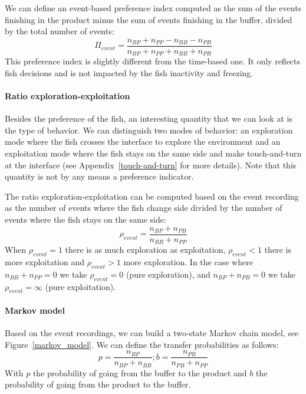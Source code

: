   We can define an event-based preference index computed as the sum of the events finishing in the product minus the sum of events finishing in the buffer, divided by the total number of events:
  \begin{equation}
    \Pi_{event} = \frac{n_{BP} + n_{PP} - n_{BB} - n_{PB}}{n_{BP} + n_{PP} + n_{BB} + n_{PB}}
  \end{equation}
  \noindent This preference index is slightly different from the time-based one. It only reflects fish decisions and is not impacted by the fish inactivity and freezing.

  \paragraph{Ratio exploration-exploitation} Besides the preference of the fish, an interesting quantity that we can look at is the type of behavior. We can distinguish two modes of behavior: an exploration mode where the fish crosses the interface to explore the environment and an exploitation mode where the fish stays on the same side and make touch-and-turn at the interface (see Appendix~\ref{touch-and-turn} for more details). Note that this quantity is not by any means a preference indicator.

  The ratio exploration-exploitation can be computed based on the event recording as the number of events where the fish change side divided by the number of events where the fish stays on the same side:
  \begin{equation}
    \rho_{event} = \frac{n_{BP} + n_{PB}}{n_{BB} + n_{PP}}
  \end{equation}
\noindent When $\rho_{event} = 1$ there is as much exploration as exploitation, $\rho_{event} < 1$ there is more exploitation and $\rho_{event} > 1$ more exploration. In the case where $n_{BB} + n_{PP} = 0$ we take $\rho_{event} = 0$ (pure exploration),  and $n_{BP} + n_{PB} = 0$ we take $\rho_{event} = \infty$ (pure exploitation).

  \paragraph{Markov model} Based on the event recordings, we can build a two-state Markov chain model, see Figure~\ref{markov_model}. We can define the transfer probabilities as follows:
  \begin{equation}
    p = \frac{n_{BP}}{n_{BP} + n_{BB}} ;
    b = \frac{n_{PB}}{n_{PB} + n_{PP}}
  \end{equation}
  \noindent With $p$ the probability of going from the buffer to the product and $b$ the probability of going from the product to the buffer.

